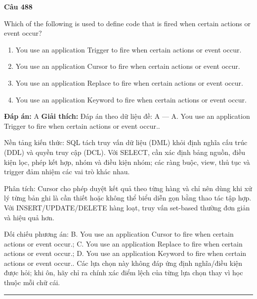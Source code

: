 \documentclass[11pt,a4paper]{article}
\newenvironment{question}[1]{%
  \par\vspace{1em}\noindent\textbf{\large Câu #1}\par\vspace{0.4em}
}{%
  \par\vspace{1em}\hrule\vspace{0.6em}
}
\newenvironment{choices}{%
  \begin{enumerate}[label=\textbf{\Alph*.},leftmargin=2.2em,itemsep=2pt,topsep=3pt]
}{%
  \end{enumerate}
}
\newcommand{\choice}{\item}
\begin{document}
\begin{question}{488}
Which of the following is used to define code that is fired when certain actions or event occur?
\begin{choices}
\choice You use an application Trigger to fire when certain actions or event occur.
\choice You use an application Cursor to fire when certain actions or event occur.
\choice You use an application Replace to fire when certain actions or event occur.
\choice You use an application Keyword to fire when certain actions or event occur.
\end{choices}
\textbf{Đáp án:} A
\textbf{Giải thích:} Đáp án theo dữ liệu đề: A — A. You use an application Trigger to fire when certain actions or event occur..

Nền tảng kiến thức: SQL tách truy vấn dữ liệu (DML) khỏi định nghĩa cấu trúc (DDL) và quyền truy cập (DCL). Với SELECT, cần xác định bảng nguồn, điều kiện lọc, phép kết hợp, nhóm và điều kiện nhóm; các ràng buộc, view, thủ tục và trigger đảm nhiệm các vai trò khác nhau.

Phân tích: Cursor cho phép duyệt kết quả theo từng hàng và chỉ nên dùng khi xử lý từng bản ghi là cần thiết hoặc không thể biểu diễn gọn bằng thao tác tập hợp. Với INSERT/UPDATE/DELETE hàng loạt, truy vấn set-based thường đơn giản và hiệu quả hơn.

Đối chiếu phương án: B. You use an application Cursor to fire when certain actions or event occur.; C. You use an application Replace to fire when certain actions or event occur.; D. You use an application Keyword to fire when certain actions or event occur.. Các lựa chọn này không đáp ứng định nghĩa/điều kiện được hỏi; khi ôn, hãy chỉ ra chính xác điểm lệch của từng lựa chọn thay vì học thuộc mỗi chữ cái.
\end{question}
\end{document}
